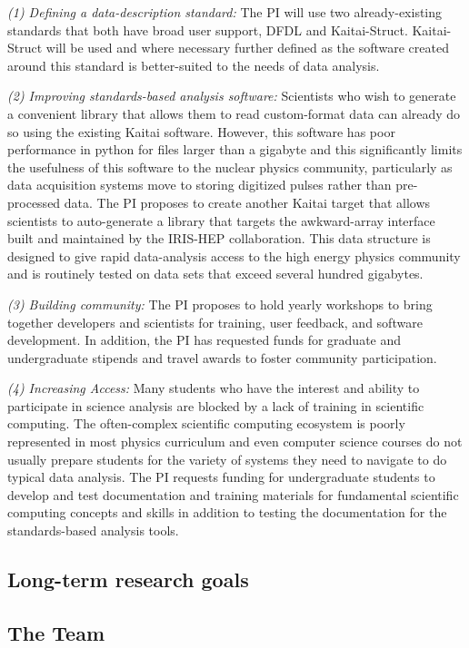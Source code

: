 {\it (1) Defining a data-description standard:} The PI will use two already-existing standards that both have broad user support, DFDL and Kaitai-Struct.  Kaitai-Struct will be used and where necessary further defined as the software created around this standard is better-suited to the needs of data analysis.

{\it (2) Improving standards-based analysis software:} Scientists who wish to generate a convenient library that allows them to read custom-format data can already do so using the existing Kaitai software.  However, this software has poor performance in python for files larger than a gigabyte and this significantly limits the usefulness of this software to the nuclear physics community, particularly as data acquisition systems move to storing digitized pulses rather than pre-processed data.  The PI proposes to create another Kaitai target that allows scientists to auto-generate a library that targets the awkward-array interface built and maintained by the IRIS-HEP collaboration.  This data structure is designed to give rapid data-analysis access to the high energy physics community and is routinely tested on data sets that exceed several hundred gigabytes.

{\it (3) Building community:} The PI proposes to hold yearly workshops to bring together developers and scientists for training, user feedback, and software development.  In addition, the PI has requested funds for graduate and undergraduate stipends and travel awards to foster community participation.

{\it (4) Increasing Access:} Many students who have the interest and ability to participate in science analysis are blocked by a lack of training in scientific computing.  The often-complex scientific computing ecosystem is poorly represented in most physics curriculum and even computer science courses do not usually prepare students for the variety of systems they need to navigate to do typical data analysis.  The PI requests funding for undergraduate students to develop and test documentation and training materials for fundamental scientific computing concepts and skills in addition to testing the documentation for the standards-based analysis tools.

\subsection{Long-term research goals}


\subsection{The Team}

